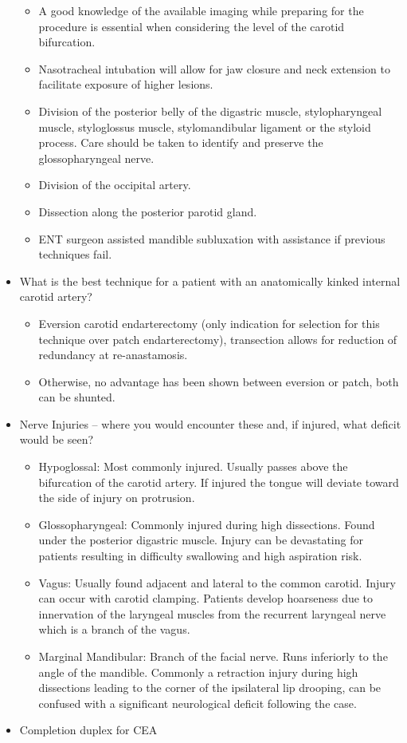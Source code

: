 \documentclass[
]{book}
\begin{document}
\begin{itemize}
  \begin{itemize}
  \item
    A good knowledge of the available imaging while preparing for
    the procedure is essential when considering the level of the
    carotid bifurcation.
  \item
    Nasotracheal intubation will allow for jaw closure and neck
    extension to facilitate exposure of higher lesions.
  \item
    Division of the posterior belly of the digastric muscle,
    stylopharyngeal muscle, styloglossus muscle, stylomandibular
    ligament or the styloid process. Care should be taken to
    identify and preserve the glossopharyngeal nerve.
  \item
    Division of the occipital artery.
  \item
    Dissection along the posterior parotid gland.
  \item
    ENT surgeon assisted mandible subluxation with assistance if
    previous techniques fail.
  \end{itemize}
\item
  What is the best technique for a patient with an anatomically kinked
  internal carotid artery?

  \begin{itemize}
  \item
    Eversion carotid endarterectomy (only indication for selection
    for this technique over patch endarterectomy), transection
    allows for reduction of redundancy at re-anastamosis.
  \item
    Otherwise, no advantage has been shown between eversion or
    patch, both can be shunted.
  \end{itemize}
\item
  Nerve Injuries -- where you would encounter these and, if injured,
  what deficit would be seen?

  \begin{itemize}
  \item
    Hypoglossal: Most commonly injured. Usually passes above the
    bifurcation of the carotid artery. If injured the tongue will
    deviate toward the side of injury on protrusion.
  \item
    Glossopharyngeal: Commonly injured during high dissections.
    Found under the posterior digastric muscle. Injury can be
    devastating for patients resulting in difficulty swallowing and
    high aspiration risk.
  \item
    Vagus: Usually found adjacent and lateral to the common carotid.
    Injury can occur with carotid clamping. Patients develop
    hoarseness due to innervation of the laryngeal muscles from the
    recurrent laryngeal nerve which is a branch of the vagus.
  \item
    Marginal Mandibular: Branch of the facial nerve. Runs inferiorly
    to the angle of the mandible. Commonly a retraction injury
    during high dissections leading to the corner of the ipsilateral
    lip drooping, can be confused with a significant neurological
    deficit following the case.
  \end{itemize}
\item
  Completion duplex for CEA


\end{itemize}
\end{document}
